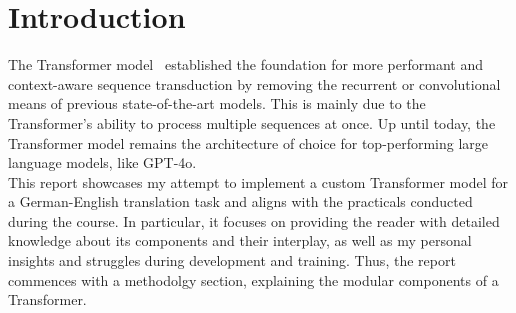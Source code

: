 \section{Introduction}

The Transformer model~\cite{vaswani2023attentionneed} established the
foundation for more performant and context-aware sequence transduction by
removing the recurrent or convolutional means of previous state-of-the-art
models. This is mainly due to the Transformer's ability to process multiple
sequences at once. Up until today, the Transformer model remains the
architecture of choice for top-performing large language models, like GPT-4o.
\\
This report showcases my attempt to implement a custom Transformer model for
a German-English translation task and aligns with the practicals conducted
during the course. In particular, it focuses on providing the reader with
detailed knowledge about its components and their interplay, as well as my
personal insights and struggles during development and training. Thus, the
report commences with a methodolgy section, explaining the modular components
of a Transformer. 

